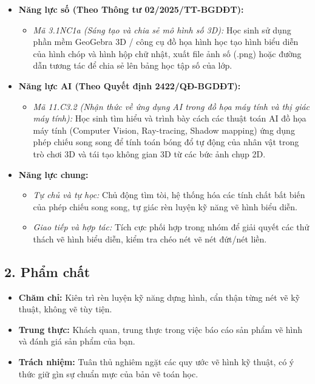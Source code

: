\documentclass[12pt, a4paper]{article}
\begin{document}
\begin{itemize}[leftmargin=1.2cm]
    \item \textbf{Năng lực số (Theo Thông tư 02/2025/TT-BGDĐT):}
    \begin{itemize}[leftmargin=0.6cm]
        \item \textit{Mã 3.1NC1a (Sáng tạo và chia sẻ mô hình số 3D):} Học sinh sử dụng phần mềm GeoGebra 3D / công cụ đồ họa hình học tạo hình biểu diễn của hình chóp và hình hộp chữ nhật, xuất file ảnh số (.png) hoặc đường dẫn tương tác để chia sẻ lên bảng học tập số của lớp.
    \end{itemize}

    \item \textbf{Năng lực AI (Theo Quyết định 2422/QĐ-BGDĐT):}
    \begin{itemize}[leftmargin=0.6cm]
        \item \textit{Mã 11.C3.2 (Nhận thức về ứng dụng AI trong đồ họa máy tính và thị giác máy tính):} Học sinh tìm hiểu và trình bày cách các thuật toán AI đồ họa máy tính (Computer Vision, Ray-tracing, Shadow mapping) ứng dụng phép chiếu song song để tính toán bóng đổ tự động của nhân vật trong trò chơi 3D và tái tạo không gian 3D từ các bức ảnh chụp 2D.
    \end{itemize}

    \item \textbf{Năng lực chung:}
    \begin{itemize}[leftmargin=0.6cm]
        \item \textit{Tự chủ và tự học:} Chủ động tìm tòi, hệ thống hóa các tính chất bất biến của phép chiếu song song, tự giác rèn luyện kỹ năng vẽ hình biểu diễn.
        \item \textit{Giao tiếp và hợp tác:} Tích cực phối hợp trong nhóm để giải quyết các thử thách vẽ hình biểu diễn, kiểm tra chéo nét vẽ nét đứt/nét liền.
    \end{itemize}
\end{itemize}

\subsection*{2. Phẩm chất}

\begin{itemize}[leftmargin=1.2cm]
    \item \textbf{Chăm chỉ:} Kiên trì rèn luyện kỹ năng dựng hình, cẩn thận từng nét vẽ kỹ thuật, không vẽ tùy tiện.
    \item \textbf{Trung thực:} Khách quan, trung thực trong việc báo cáo sản phẩm vẽ hình và đánh giá sản phẩm của bạn.
    \item \textbf{Trách nhiệm:} Tuân thủ nghiêm ngặt các quy ước vẽ hình kỹ thuật, có ý thức giữ gìn sự chuẩn mực của bản vẽ toán học.
\end{itemize}
\end{document}
